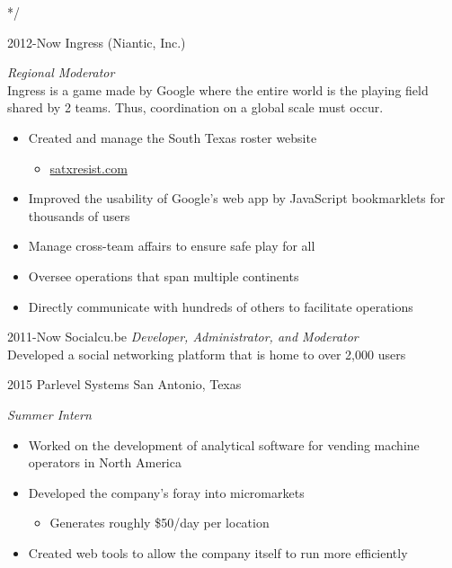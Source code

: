 \documentclass[]{friggeri-cv} %
\begin{document}
*/ 


\begin{entrylist}

\entry
{2012-Now}
{Ingress (Niantic, Inc.)}
{}
{\emph{Regional Moderator} \\ 
Ingress is a game made by Google where the entire world is the playing field shared by 2 teams. Thus, coordination on a global scale must occur. 
	\begin{itemize}
	\item Created and manage the South Texas roster website 
	\begin{itemize}
		\item \href{http://satxresist.com}{satxresist.com}
	\end{itemize}
	\item Improved the usability of Google's web app by JavaScript bookmarklets for thousands of users 
	\item Manage cross-team affairs to ensure safe play for all 
	\item Oversee operations that span multiple continents 
	\item Directly communicate with hundreds of others to facilitate operations 
	\end{itemize}
	}


\entry
{2011-Now}
{Socialcu.be}
{}
{\emph{Developer, Administrator, and Moderator} \\
Developed a social networking platform that is home to over 2,000 users}


\entry
{2015}
{Parlevel Systems}
{San Antonio, Texas}
{\emph{Summer Intern} 
	\begin{itemize}
	\item Worked on the development of analytical software for vending machine operators in North America 
	\item Developed the company's foray into micromarkets 
	\begin{itemize}
		\item Generates roughly \$50/day per location 
	\end{itemize}
	\item Created web tools to allow the company itself to run more efficiently
	\end{itemize}
	}


\end{entrylist}
\end{document}

